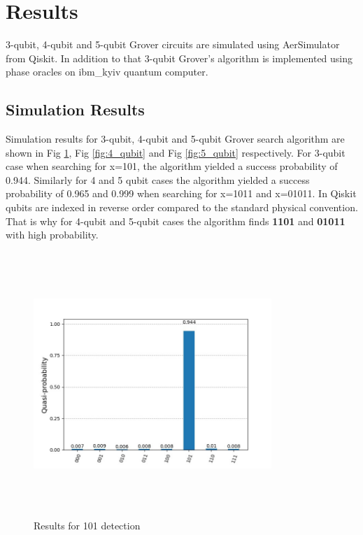 \documentclass[conference]{IEEEtran}
\begin{document}
\section{Results}
3-qubit, 4-qubit and 5-qubit Grover circuits are simulated using AerSimulator from Qiskit. In addition to that 3-qubit Grover's algorithm is implemented using phase oracles on ibm\_kyiv quantum computer.
\subsection{Simulation Results}
Simulation results for 3-qubit, 4-qubit and 5-qubit Grover
search algorithm are shown in Fig \ref{fig:3_qubit}, Fig \ref{fig:4_qubit} and Fig \ref{fig:5_qubit} respectively. For 3-qubit case when searching for x=101, the algorithm yielded a success probability of 0.944. Similarly for 4 and 5 qubit cases the algorithm yielded a success probability of 0.965 and 0.999 when searching for x=1011 and x=01011. In Qiskit qubits are indexed in reverse order compared to the standard physical convention. That is why for 4-qubit and 5-qubit cases the algorithm finds \textbf{1101} and \textbf{01011} with high probability.

\begin{figure}[htbp]
	\centerline{\includegraphics[width=9cm,height=10cm,keepaspectratio]{3_qubit.png}}
	\caption{Results for 101 detection}
	\label{fig:3_qubit}
\end{figure}
\end{document}
